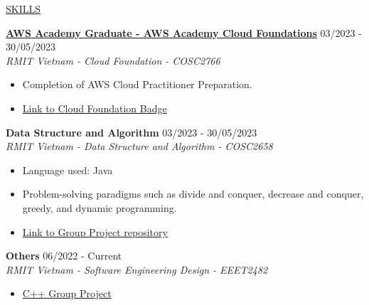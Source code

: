 \documentclass[11pt]{article}
\newcommand{\betteruline}[1]{
    \uline{#1}
}
\newcommand{\sectiontitle}[1]{
    \begingroup
        \titlebold
        \betteruline{\Large\uppercase{#1}  }
        \vspace{1.7mm}
    \endgroup
}
\newcommand{\sectioncontent}[1]{
    \begingroup
        \begin{FlushLeft}
        \vspace{-3mm}
        \sffamily\small#1
        \end{FlushLeft}
    \endgroup
    \vspace{2mm}
}
\newcommand{\project}[2]{
    \begingroup
        \textbf{\small#1}
        \hfill\color{black!70}\small{#2}
    \endgroup
}
\newcommand{\spacevv}{
    \vspace{2mm}
}
\begin{document}
\begin{paracol}{2}
    \sectiontitle{Skills}
    \sectioncontent{
    \vspace{1mm}
        \project{\href{https://www.credly.com/badges/20c053cd-785a-4100-bc79-bd1c902d5c28/public_url}{AWS Academy Graduate - AWS Academy Cloud Foundations}}{03/2023 - 30/05/2023} \\
    \vspace{1mm}
        \textcolor{black!70}{\textit{RMIT Vietnam - Cloud Foundation - COSC2766}}
        \vspace{1mm}
        \begin{itemize}
            \item  Completion of AWS Cloud Practitioner Preparation.
\vspace{1mm} 
            \item \textcolor{blue}{\href{https://www.credly.com/badges/20c053cd-785a-4100-bc79-bd1c902d5c28/public_url}{Link to Cloud Foundation Badge}}
        \end{itemize}
        \spacevv

       \project{Data Structure and Algorithm}{03/2023 - 30/05/2023} \\
    \vspace{1mm}
        \textcolor{black!70}{\textit{RMIT Vietnam - Data Structure and Algorithm - COSC2658}}
        \vspace{1mm}
        \begin{itemize}
        \item Language used: Java
\vspace{1mm} 
\item Problem-solving paradigms such as divide and conquer, decrease and conquer, greedy, and dynamic programming.
\vspace{1mm} 
            \item \textcolor{blue}{\href{https://github.com/miketvo/rmit2023a-cosc2658-group-project}{Link to Group Project repository}}
        \end{itemize}
        \spacevv
       
        \project{Others}{06/2022 - Current} \\
        \textcolor{black!70}{\textit{RMIT Vietnam - Software Engineering Design - EEET2482}}
        \begin{itemize}
            \item  \textcolor{blue}{\href{https://github.com/miketvo/rmit2022c-eeet2482-lodging-app}{C++ Group Project}}

        \end{itemize}
        \spacevv
    }


\end{paracol}
\end{document}
